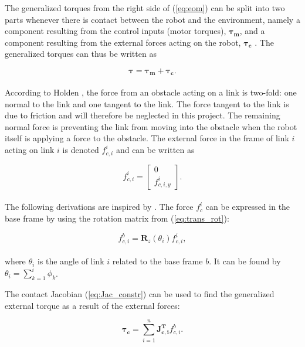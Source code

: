 The generalized torques from the right side of (\ref{eq:eom}) can be split into two parts whenever there is contact between the robot and the environment, namely a component resulting from the control inputs (motor torques), $\boldsymbol{\tau_{m}}$, and a component resulting from the external forces acting on the robot, $\boldsymbol{\tau_{c}}$ \cite{rezapour2014path}. The generalized torques can thus be written as

\begin{equation}
    \boldsymbol{\tau} = \boldsymbol{\tau_{m}} + \boldsymbol{\tau_{c}}.
\end{equation}
\\
According to Holden \cite{holden2014optimal}, the force from an obstacle acting on a link is two-fold: one normal to the link and one tangent to the link. The force tangent to the link is due to friction and will therefore be neglected in this project. The remaining normal force is preventing the link from moving into the obstacle when the robot itself is applying a force to the obstacle. The external force in the frame of link $i$ acting on link $i$ is denoted $f^i_{c,i}$ and can be written as

\begin{equation}
    f^i_{c,i}=
    \begin{bmatrix}
        0 \\
        f^i_{c,i,y}
    \end{bmatrix}.
\end{equation}
\\
The following derivations are inspired by \cite{rezapour2014path}. The force $f^i_c$ can be expressed in the base frame by using the rotation matrix from (\ref{eq:trans_rot}):

\begin{equation}
    f^b_{c,i} = \mathbf{R}_z(\theta_i) f^i_{c,i},
\end{equation}
\\
where $\theta_i$ is the angle of link $i$ related to the base frame $b$. It can be found by $\theta_i = \sum_{k=1}^{i} \phi_k$.

The contact Jacobian (\ref{eq:Jac_constr}) can be used to find the generalized external torque as a result of the external forces:

\begin{equation}
    \boldsymbol{\tau_c} = \sum_{i=1}^{n} \mathbf{J^T_{c,i}} f^b_{c,i}.
\end{equation}



